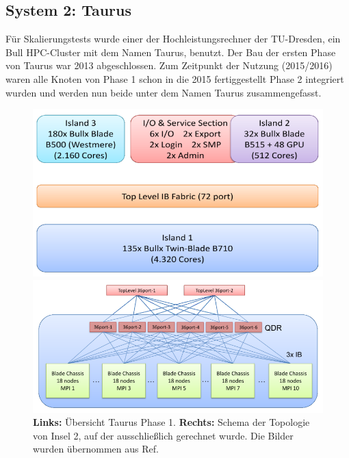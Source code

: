 \subsection{System 2: Taurus}
\label{sct:system2}


Für Skalierungstests wurde einer der Hochleistungsrechner der TU-Dresden, ein Bull HPC-Cluster mit dem Namen Taurus, benutzt. Der Bau der ersten Phase von Taurus war 2013 abgeschlossen\cite{taurusnutzerschulung}. Zum Zeitpunkt der Nutzung (2015/2016) waren alle Knoten von Phase 1 schon in die 2015 fertiggestellt\cite{heisehrsk2} Phase 2 integriert wurden\cite{doctudtaurushardware} und werden nun beide unter dem Namen Taurus zusammengefasst.

\begin{figure}[H]
	\centering
	\begin{minipage}{0.5\linewidth}
		\includegraphics[width=\linewidth]{taurusphase1}
	\end{minipage}\begin{minipage}{0.5\linewidth}
		\includegraphics[width=\linewidth]{taurusphase1island1interconnects}
	\end{minipage}
	\caption{\textbf{Links:} Übersicht Taurus Phase 1. \textbf{Rechts:} Schema der Topologie von Insel 2, auf der ausschließlich gerechnet wurde. Die Bilder wurden übernommen aus Ref.\cite{taurusnutzerschulung}}
	\label{fig:taurusphase1}
\end{figure}

